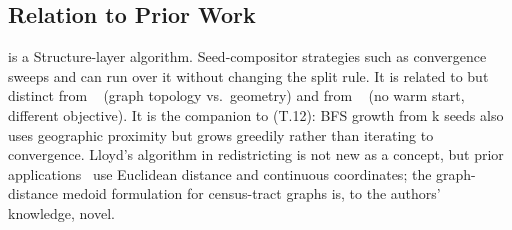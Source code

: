 \subsection{Relation to Prior Work}

\cvd{} is a Structure-layer algorithm.
Seed-compositor strategies such as convergence sweeps and \be{} can run over
it without changing the split rule.
It is related to but distinct from \metis{}~\citep{karypis1998} (graph
topology vs.\ geometry) and from \sa{}~\citep{b19paper} (no warm start,
different objective).
It is the companion to \bfsgrowth{} (T.12): BFS growth from k seeds also
uses geographic proximity but grows greedily rather than iterating to
convergence.
Lloyd's algorithm in redistricting is not new as a concept, but prior
applications~\citep{du1999} use Euclidean distance and continuous coordinates;
the graph-distance medoid formulation for census-tract graphs is, to the
authors' knowledge, novel.

